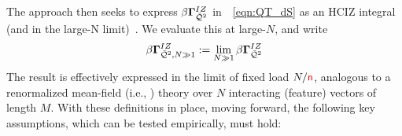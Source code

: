 The \SETOL approach then seeks to express $\beta\mathbf{\Gamma}^{IZ}_{\bar{\mathcal{Q}}^{2}}$ in~\EQN~\ref{eqn:QT_dS} as an HCIZ integral (and in the large-N limit)~\cite{potters_bouchaud_2020,Tanaka2007,Tanaka2008}.
We evaluate this at large-$N$, and write
\begin{equation}
  \beta\mathbf{\Gamma}^{IZ}_{\bar{\mathcal{Q}}^{2},N\gg 1}:=\lim_{N\gg 1}\beta\mathbf{\Gamma}^{IZ}_{\bar{\mathcal{Q}}^{2}}
\end{equation}
The result is effectively expressed in the limit of fixed load $N/{\color{red}\sf{n}}$, analogous to a renormalized mean-field  (i.e., \SemiEmpirical) theory over $N$ interacting (feature) vectors of length $M$.
With these definitions in place, moving forward, the following key assumptions, which can be tested empirically, must hold:
